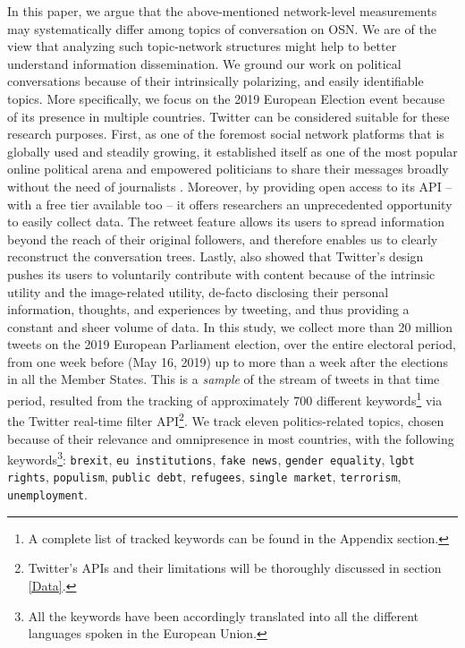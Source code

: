 In this paper, we argue that the above-mentioned network-level measurements may systematically differ among topics of conversation on OSN. We are of the view that analyzing such topic-network structures might help to better understand information dissemination. We ground our work on political conversations because of their intrinsically polarizing, and easily identifiable topics. More specifically, we focus on the 2019 European Election event because of its presence in multiple countries. Twitter can be considered suitable for these research purposes. First, as one of the foremost social network platforms that is globally used and steadily growing, it established itself as one of the most popular online political arena \citep{tumasjan:2011} and empowered politicians to share their messages broadly without the need of journalists \citep{blumler:2001}. Moreover, by providing open access to its API – with a free tier available too – it offers researchers an unprecedented opportunity to easily collect data. The retweet feature allows its users to spread information beyond the reach of their original followers, and therefore enables us to clearly reconstruct the conversation trees. Lastly, \citet{Toubia:2013} also showed that Twitter's design pushes its users to voluntarily contribute with content because of the intrinsic utility and the image-related utility, de-facto disclosing their personal information, thoughts, and experiences by tweeting, and thus providing a constant and sheer volume of data.
In this study, we collect more than 20 million tweets on the 2019 European Parliament election, over the entire electoral period, from one week before (May 16, 2019) up to more than a week after the elections in all the Member States. This is a \emph{sample} of the stream of tweets in that time period, resulted from the tracking of approximately 700 different keywords\footnote{A complete list of tracked keywords can be found in the Appendix section.} via the Twitter real-time filter API\footnote{Twitter's APIs and their limitations will be thoroughly discussed in section \ref{Data}.}. We track eleven politics-related topics, chosen because of their relevance and omnipresence in most countries, with the following keywords\footnote{All the keywords have been accordingly translated into all the different languages spoken in the European Union.}: \texttt{brexit}, \texttt{eu institutions}, \texttt{fake news}, \texttt{gender equality}, \texttt{lgbt rights}, \texttt{populism}, \texttt{public debt}, \texttt{refugees}, \texttt{single market}, \texttt{terrorism}, \texttt{unemployment}.
